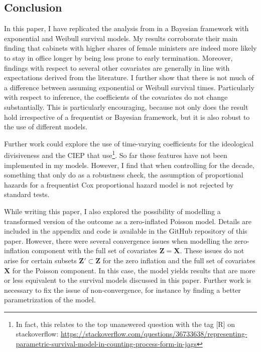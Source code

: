 \documentclass[11pt]{article}
\begin{document}
\clearpage

\subsection{Conclusion}
In this paper, I have replicated the analysis from \textcite{KK20} in a Bayesian framework with exponential and Weibull survival models. My results corroborate their main finding that cabinets with higher shares of female ministers are indeed more likely to stay in office longer by being less prone to early termination. Moreover, findings with respect to several other covariates are generally in line with expectations derived from the literature. I further show that there is not much of a difference between assuming exponential or Weibull survival times. Particularly with respect to inference, the coefficients of the covariates do not change substantially. This is particularly encouraging, because not only does the result hold irrespective of a frequentist or Bayesian framework, but it is also robust to the use of different models.

Further work could explore the use of time-varying coefficients for the ideological divisiveness and the CIEP that \textcite{KK20} use\footnote{In fact, this relates to the top unanswered question with the tag [R] on stackoverflow: \url{https://stackoverflow.com/questions/36733638/representing-parametric-survival-model-in-counting-process-form-in-jags}}. So far these features have not been implemented in my models. However, I find that when controlling for the decade, something that \textcite{KK20} only do as a robustness check, the assumption of proportional hazards for a frequentist Cox proportional hazard model is not rejected by standard tests. 

While writing this paper, I also explored the possibility of modelling a transformed version of the outcome as a zero-inflated Poisson model. Details are included in the appendix and code is available in the GitHub repository of this paper. However, there were several convergence issues when modelling the zero-inflation component with the full set of covariates $\bm{Z} = \bm{X}$. These issues do not arise for certain subsets $\bm{Z}' \subset \bm{Z}$ for the zero inflation and the full set of covariates $\bm{X}$ for the Poisson component. In this case, the model yields results that are more or less equivalent to the survival models discussed in this paper. Further work is necessary to fix the issue of non-convergence, for instance by finding a better parametrization of the model. 

\clearpage

\printbibliography

\newpage


\end{document}
